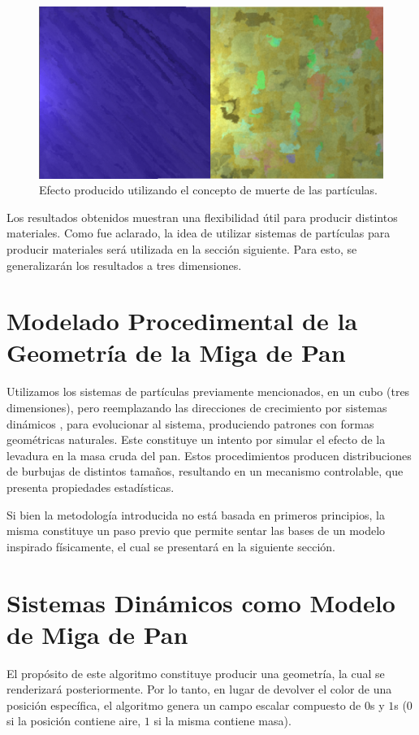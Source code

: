 \begin{figure}[t!]
\centering
\includegraphics[scale=0.2]{figures/muerte}
\caption{Efecto producido utilizando el concepto de muerte de las partículas.}
\label{muerte}
\end{figure}

Los resultados obtenidos muestran una flexibilidad útil para producir distintos materiales.
Como fue aclarado, la idea de utilizar sistemas de partículas para producir materiales será utilizada en la sección siguiente.
Para esto, se generalizarán los resultados a tres dimensiones.

\section{Modelado Procedimental de la Geometría de la Miga de Pan}


Utilizamos los sistemas de partículas previamente mencionados, en un cubo (tres dimensiones), pero reemplazando las direcciones de crecimiento por sistemas dinámicos \cite{Strogatz2001}, para evolucionar al sistema, produciendo patrones con formas geométricas naturales.
Este constituye un intento por simular el efecto de la levadura en la masa cruda del pan.
Estos procedimientos producen distribuciones de burbujas de distintos tamaños, resultando en un mecanismo controlable, que presenta propiedades estadísticas.

Si bien la metodología introducida no está basada en primeros principios, la misma constituye un paso previo que permite sentar las bases de un modelo inspirado físicamente, el cual se presentará en la siguiente sección.

\section{Sistemas Dinámicos como Modelo de Miga de Pan}
El propósito de este algoritmo constituye producir una geometría, la cual se renderizará posteriormente.
Por lo tanto, en lugar de devolver el color de una posici\'on espec\'ifica, el algoritmo genera un campo escalar compuesto de $0$s y $1$s ($0$ si la posici\'on contiene aire, $1$ si la misma contiene masa).

